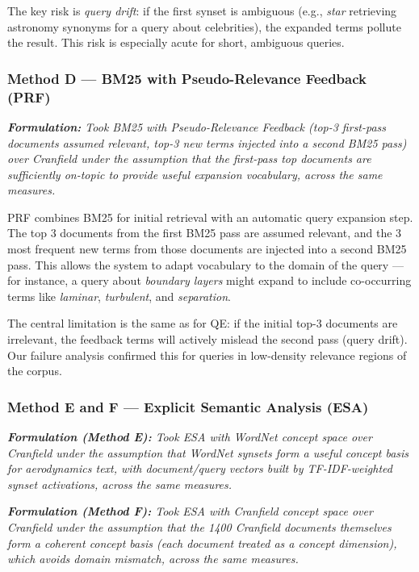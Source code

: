 \documentclass{svproc}
\begin{document}
    The key risk is \emph{query drift}: if the first synset is ambiguous (e.g., \textit{star} retrieving astronomy synonyms for a query about celebrities), the expanded terms pollute the result. This risk is especially acute for short, ambiguous queries.

    \subsubsection{Method D — BM25 with Pseudo-Relevance Feedback (PRF)}

    \textit{\textbf{Formulation:} Took BM25 with Pseudo-Relevance Feedback (top-3 first-pass documents assumed relevant, top-3 new terms injected into a second BM25 pass) over Cranfield under the assumption that the first-pass top documents are sufficiently on-topic to provide useful expansion vocabulary, across the same measures.}

    PRF combines BM25 for initial retrieval with an automatic query expansion step. The top 3 documents from the first BM25 pass are assumed relevant, and the 3 most frequent new terms from those documents are injected into a second BM25 pass. This allows the system to adapt vocabulary to the domain of the query — for instance, a query about \textit{boundary layers} might expand to include co-occurring terms like \textit{laminar}, \textit{turbulent}, and \textit{separation}.

    The central limitation is the same as for QE: if the initial top-3 documents are irrelevant, the feedback terms will actively mislead the second pass (query drift). Our failure analysis confirmed this for queries in low-density relevance regions of the corpus.

    \subsubsection{Method E and F — Explicit Semantic Analysis (ESA)}

    \textit{\textbf{Formulation (Method E):} Took ESA with WordNet concept space over Cranfield under the assumption that WordNet synsets form a useful concept basis for aerodynamics text, with document/query vectors built by TF-IDF-weighted synset activations, across the same measures.}

    \textit{\textbf{Formulation (Method F):} Took ESA with Cranfield concept space over Cranfield under the assumption that the 1400 Cranfield documents themselves form a coherent concept basis (each document treated as a concept dimension), which avoids domain mismatch, across the same measures.}
\end{document}
